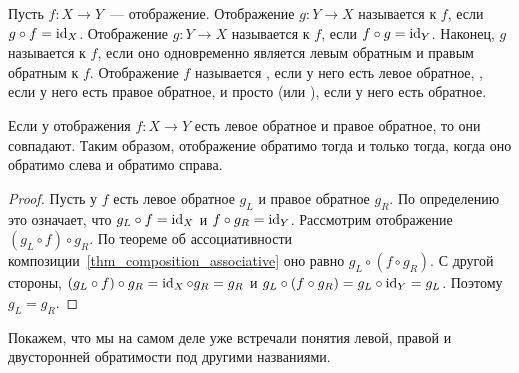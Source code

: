 \begin{definition}\label{dfn:inverse-map}
Пусть $f\colon X\to Y$~--- отображение. Отображение $g\colon Y\to X$
называется  к
$f$, если $g\circ f = \operatorname{id}_X$. Отображение $g\colon Y\to X$ называется
 к $f$, если
$f\circ g = \operatorname{id}_Y$. Наконец, $g$ называется
 к $f$, если
оно одновременно является левым обратным и правым обратным к $f$.
Отображение $f$ называется
,
если у него есть левое обратное,
, если у
него есть правое  обратное, и просто
 (или
),
если у него есть обратное.
\end{definition}

\begin{lemma}\label{lemma:invertible_left_and_right}
Если у отображения $f\colon X\to Y$ есть левое обратное и правое
обратное, то они совпадают. Таким образом, отображение обратимо тогда
и только тогда, когда оно обратимо слева и обратимо справа.
\end{lemma}
\begin{proof}
Пусть у $f$ есть левое обратное $g_L$ и правое обратное $g_R$. По
определению это означает, что
$g_L\circ f=\operatorname{id}_X$ и $f\circ g_R = \operatorname{id}_Y$.
Рассмотрим отображение $(g_L\circ f)\circ g_R$. По теореме об
ассоциативности композиции~\ref{thm_composition_associative} оно равно
$g_L\circ (f\circ g_R)$. С другой стороны,
$(g_L\circ f)\circ g_R = \operatorname{id}_X\circ g_R = g_R$ и
$g_L\circ (f\circ g_R) = g_L\circ\operatorname{id}_Y = g_L$. Поэтому $g_L = g_R$.
\end{proof}

Покажем, что мы на самом деле уже встречали понятия левой, правой и
двусторонней обратимости под другими названиями.

